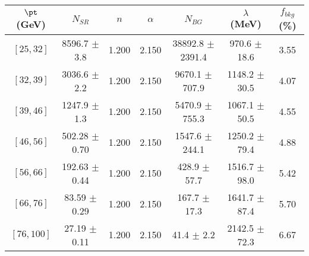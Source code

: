 \begin{tabular}{c||c|c|c|c|c||c}
$\pt$ (GeV) & $N_{SR}$ & $n$ & $\alpha$ & $N_{BG}$  & $\lambda$ (MeV) & $f_{bkg}$ (\%) \\
\hline
$[25, 32]$ & 8596.7 $\pm$ 3.8 & 1.200 & 2.150 & 38892.8 $\pm$ 2391.4 & 970.6 $\pm$ 18.6 & 3.55\\
$[32, 39]$ & 3036.6 $\pm$ 2.2 & 1.200 & 2.150 & 9670.1 $\pm$ 707.9 & 1148.2 $\pm$ 30.5 & 4.07\\
$[39, 46]$ & 1247.9 $\pm$ 1.3 & 1.200 & 2.150 & 5470.9 $\pm$ 755.3 & 1067.1 $\pm$ 50.5 & 4.55\\
$[46, 56]$ & 502.28 $\pm$ 0.70 & 1.200 & 2.150 & 1547.6 $\pm$ 244.1 & 1250.2 $\pm$ 79.4 & 4.88\\
$[56, 66]$ & 192.63 $\pm$ 0.44 & 1.200 & 2.150 & 428.9 $\pm$ 57.7 & 1516.7 $\pm$ 98.0 & 5.42\\
$[66, 76]$ & 83.59 $\pm$ 0.29 & 1.200 & 2.150 & 167.7 $\pm$ 17.3 & 1641.7 $\pm$ 87.4 & 5.70\\
$[76, 100]$ & 27.19 $\pm$ 0.11 & 1.200 & 2.150 & 41.4 $\pm$ 2.2 & 2142.5 $\pm$ 72.3 & 6.67\\
\end{tabular}

